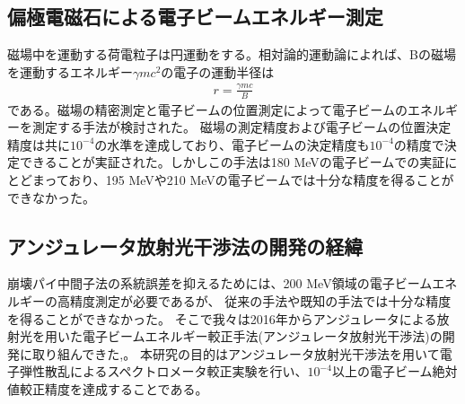 \documentclass[a4paper,11pt,uplatex]{jsbook}
\begin{document}
\subsection{偏極電磁石による電子ビームエネルギー測定}
磁場中を運動する荷電粒子は円運動をする。相対論的運動論によれば、Bの磁場を運動するエネルギー$\gamma mc^2$の電子の運動半径は
\begin{eqnarray}
  r = \frac{\gamma mc}{B}
\end{eqnarray}
である。磁場の精密測定と電子ビームの位置測定によって電子ビームのエネルギーを測定する手法が検討された。
磁場の測定精度および電子ビームの位置決定精度は共に$10^{-4}$の水準を達成しており、電子ビームの決定精度も$10^{-4}$の精度で決定できることが実証された。しかしこの手法は180 MeVの電子ビームでの実証にとどまっており、195 MeVや210 MeVの電子ビームでは十分な精度を得ることができなかった。
\subsection{アンジュレータ放射光干渉法の開発の経緯}
崩壊パイ中間子法の系統誤差を抑えるためには、200 MeV領域の電子ビームエネルギーの高精度測定が必要であるが、
従来の手法や既知の手法では十分な精度を得ることができなかった。
そこで我々は2016年からアンジュレータによる放射光を用いた電子ビームエネルギー較正手法(アンジュレータ放射光干渉法)の開発に取り組んできた\cite{klag2018},\cite{klag2023}。
本研究の目的はアンジュレータ放射光干渉法を用いて電子弾性散乱によるスペクトロメータ較正実験を行い、$10^{-4}$以上の電子ビーム絶対値較正精度を達成することである。

\end{document}
